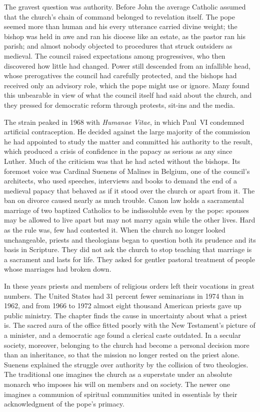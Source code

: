 The gravest question was authority. Before John the average Catholic assumed that the church's
chain of command belonged to revelation itself. The pope seemed more than human and his every
utterance carried divine weight; the bishop was held in awe and ran his diocese like an estate, as
the pastor ran his parish; and almost nobody objected to procedures that struck outsiders as
medieval. The council raised expectations among progressives, who then discovered how little had
changed. Power still descended from an infallible head, whose prerogatives the council had carefully
protected, and the bishops had received only an advisory role, which the pope might use or ignore.
Many found this unbearable in view of what the council itself had said about the church, and they
pressed for democratic reform through protests, sit-ins and the media.

The strain peaked in 1968 with \emph{Humanae Vitae}, in which Paul~VI condemned artificial
contraception. He decided against the large majority of the commission he had appointed to study the
matter and committed his authority to the result, which produced a crisis of confidence in the papacy
as serious as any since Luther. Much of the criticism was that he had acted without the bishops. Its
foremost voice was Cardinal Suenens of Malines in Belgium, one of the council's architects, who used
speeches, interviews and books to demand the end of a medieval papacy that behaved as if it stood
over the church or apart from it. The ban on divorce caused nearly as much trouble. Canon law holds a
sacramental marriage of two baptized Catholics to be indissoluble even by the pope: spouses may be
allowed to live apart but may not marry again while the other lives. Hard as the rule was, few had
contested it. When the church no longer looked unchangeable, priests and theologians began to
question both its prudence and its basis in Scripture. They did not ask the church to stop teaching
that marriage is a sacrament and lasts for life. They asked for gentler pastoral treatment of people
whose marriages had broken down.

In these years priests and members of religious orders left their vocations in great numbers. The
United States had 31 percent fewer seminarians in 1974 than in 1962, and from 1966 to 1972 almost
eight thousand American priests gave up public ministry. The chapter finds the cause in uncertainty
about what a priest is. The sacred aura of the office fitted poorly with the New Testament's picture
of a minister, and a democratic age found a clerical caste outdated. In a secular society, moreover,
belonging to the church had become a personal decision more than an inheritance, so that the mission
no longer rested on the priest alone. Suenens explained the struggle over authority by the collision
of two theologies. The traditional one imagines the church as a superstate under an absolute monarch
who imposes his will on members and on society. The newer one imagines a communion of spiritual
communities united in essentials by their acknowledgment of the pope's primacy.

